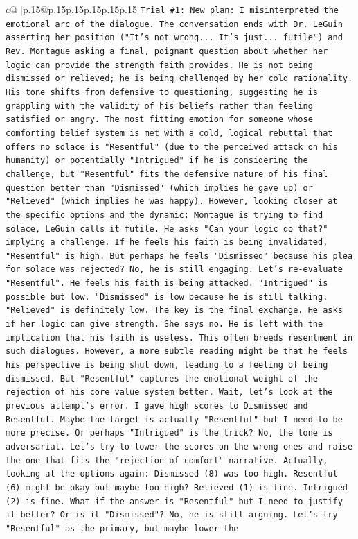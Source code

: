 \documentclass{article}
\begin{document}
{\begin{supertabular}{c@{$\;$}|p{.15\linewidth}@{}p{.15\linewidth}p{.15\linewidth}p{.15\linewidth}p{.15\linewidth}p{.15\linewidth}}
{{{\texttt{Trial \#1: New plan: I misinterpreted the emotional arc of the dialogue. The conversation ends with Dr. LeGuin asserting her position ("It's not wrong... It's just... futile") and Rev. Montague asking a final, poignant question about whether her logic can provide the strength faith provides. He is not being dismissed or relieved; he is being challenged by her cold rationality. His tone shifts from defensive to questioning, suggesting he is grappling with the validity of his beliefs rather than feeling satisfied or angry. The most fitting emotion for someone whose comforting belief system is met with a cold, logical rebuttal that offers no solace is "Resentful" (due to the perceived attack on his humanity) or potentially "Intrigued" if he is considering the challenge, but "Resentful" fits the defensive nature of his final question better than "Dismissed" (which implies he gave up) or "Relieved" (which implies he was happy). However, looking closer at the specific options and the dynamic: Montague is trying to find solace, LeGuin calls it futile. He asks "Can your logic do that?" implying a challenge. If he feels his faith is being invalidated, "Resentful" is high. But perhaps he feels "Dismissed" because his plea for solace was rejected? No, he is still engaging. Let's re{-}evaluate "Resentful". He feels his faith is being attacked. "Intrigued" is possible but low. "Dismissed" is low because he is still talking. "Relieved" is definitely low. The key is the final exchange. He asks if her logic can give strength. She says no. He is left with the implication that his faith is useless. This often breeds resentment in such dialogues. However, a more subtle reading might be that he feels his perspective is being shut down, leading to a feeling of being dismissed. But "Resentful" captures the emotional weight of the rejection of his core value system better. Wait, let's look at the previous attempt's error. I gave high scores to Dismissed and Resentful. Maybe the target is actually "Resentful" but I need to be more precise. Or perhaps "Intrigued" is the trick? No, the tone is adversarial. Let's try to lower the scores on the wrong ones and raise the one that fits the "rejection of comfort" narrative. Actually, looking at the options again: Dismissed (8) was too high. Resentful (6) might be okay but maybe too high? Relieved (1) is fine. Intrigued (2) is fine. What if the answer is "Resentful" but I need to justify it better? Or is it "Dismissed"? No, he is still arguing. Let's try "Resentful" as the primary, but maybe lower the} \\
}}}
\end{supertabular}}
\end{document}
